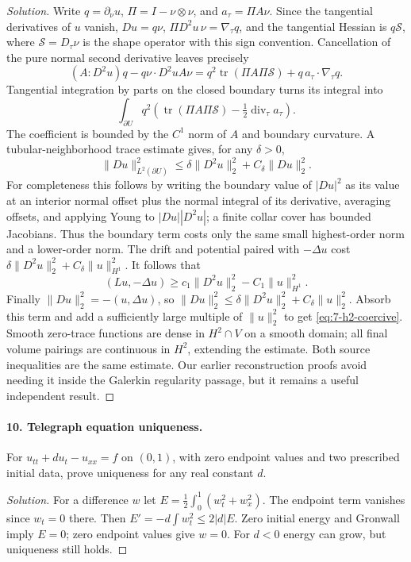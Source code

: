 \begin{proof}[Solution]
Write $q=\partial_\nu u$, $\Pi=I-\nu\otimes\nu$, and
$a_\tau=\Pi A\nu$. Since the tangential derivatives of $u$ vanish,
$Du=q\nu$, $\Pi D^2u\,\nu=\nabla_\tau q$, and the tangential Hessian
is $q\mathcal S$, where $\mathcal S=D_\tau\nu$ is the shape operator
with this sign convention. Cancellation of the pure normal second
 derivative leaves precisely
\[
 (A:D^2u)q-q\nu\cdot D^2u A\nu
 =q^2\operatorname{tr}(\Pi A\Pi\mathcal S)
    +q\,a_\tau\cdot\nabla_\tau q.
\]
Tangential integration by parts on the closed boundary turns its integral into
\[
 \int_{\partial U}q^2
 \left(\operatorname{tr}(\Pi A\Pi\mathcal S)
              -\tfrac12\operatorname{div}_\tau a_\tau\right).
\]
The coefficient is bounded by the $C^1$ norm of $A$ and boundary curvature.
A tubular-neighborhood trace estimate gives, for any $\delta>0$,
\[
 \|Du\|_{L^2(\partial U)}^2
 \leq\delta\|D^2u\|_2^2+C_\delta\|Du\|_2^2.
\]
For completeness this follows by writing the boundary value of $|Du|^2$
as its value at an interior normal offset plus the normal integral of its
derivative, averaging offsets, and applying Young to $|Du||D^2u|$;
a finite collar cover has bounded Jacobians. Thus the boundary term costs
only the same small highest-order norm and a lower-order norm.
The drift and potential paired with $-\Delta u$ cost
$\delta\|D^2u\|_2^2+C_\delta\|u\|_{H^1}^2$.
It follows that
\[
 (Lu,-\Delta u)\geq c_1\|D^2u\|_2^2-C_1\|u\|_{H^1}^2.
\]
Finally $\|Du\|_2^2=-(u,\Delta u)$, so
$\|Du\|_2^2\leq\delta\|D^2u\|_2^2+C_\delta\|u\|_2^2$.
Absorb this term and add a sufficiently large multiple of $\|u\|_2^2$
to get \eqref{eq:7-h2-coercive}. Smooth zero-trace functions are dense
in $H^2\cap V$ on a smooth domain; all final volume pairings are continuous
in $H^2$, extending the estimate. Both source inequalities are the same
estimate. Our earlier reconstruction proofs avoid needing it inside the
Galerkin regularity passage, but it remains a useful independent result.
\end{proof}
\Needspace{55mm}

\Needspace{30mm}
\paragraph{10. Telegraph equation uniqueness.}
For $u_{tt}+du_t-u_{xx}=f$ on $(0,1)$, with zero endpoint values and
two prescribed initial data, prove uniqueness for any real constant $d$.
\begin{proof}[Solution]
For a difference $w$ let $E=\frac12\int_0^1(w_t^2+w_x^2)$.
The endpoint term vanishes since $w_t=0$ there. Then
$E'=-d\int w_t^2\leq2|d|E$. Zero initial energy and Gronwall imply
$E=0$; zero endpoint values give $w=0$. For $d<0$ energy can grow,
but uniqueness still holds.
\end{proof}

